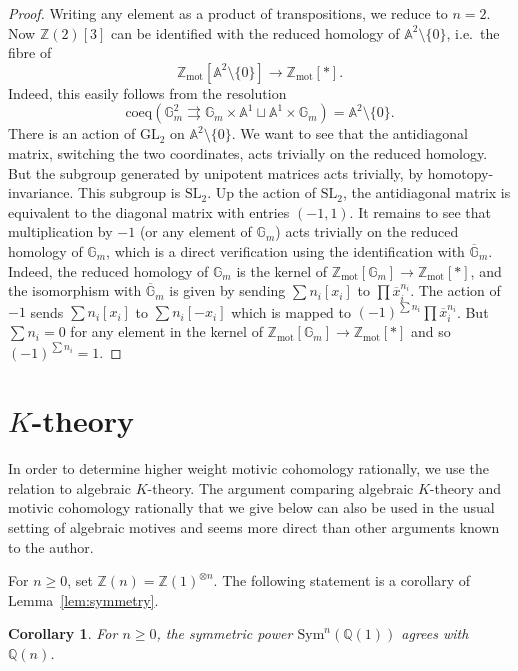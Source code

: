 \documentclass[11pt]{amsart}
\numberwithin{equation}{section}
\numberwithin{theorem}{section}
\newtheorem{corollary}[theorem]{Corollary}
\theoremstyle{definition}
\begin{document}
\begin{proof} Writing any element as a product of transpositions, we reduce to $n=2$. Now $\mathbb Z(2)[3]$ can be identified with the reduced homology of $\mathbb A^2\setminus \{0\}$, i.e.~the fibre of
\[
\mathbb Z_{\mathrm{mot}}[\mathbb A^2\setminus \{0\}]\to \mathbb Z_{\mathrm{mot}}[\ast].
\]
Indeed, this easily follows from the resolution
\[
\mathrm{coeq}(\mathbb G_m^2\rightrightarrows \mathbb G_m\times \mathbb A^1\sqcup \mathbb A^1\times \mathbb G_m)= \mathbb A^2\setminus \{0\}.
\]
There is an action of $\mathrm{GL}_2$ on $\mathbb A^2\setminus \{0\}$. We want to see that the antidiagonal matrix, switching the two coordinates, acts trivially on the reduced homology. But the subgroup generated by unipotent matrices acts trivially, by homotopy-invariance. This subgroup is $\mathrm{SL}_2$. Up the action of $\mathrm{SL}_2$, the antidiagonal matrix is equivalent to the diagonal matrix with entries $(-1,1)$. It remains to see that multiplication by $-1$ (or any element of $\mathbb G_m$) acts trivially on the reduced homology of $\mathbb G_m$, which is a direct verification using the identification with $\overline{\mathbb G}_m$. Indeed, the reduced homology of $\mathbb G_m$ is the kernel of $\mathbb Z_{\mathrm{mot}}[\mathbb G_m]\to \mathbb Z_{\mathrm{mot}}[\ast]$, and the isomorphism with $\overline{\mathbb G}_m$ is given by sending $\sum n_i [x_i]$ to $\prod \overline{x}_i^{n_i}$. The action of $-1$ sends $\sum n_i [x_i]$ to $\sum n_i [-x_i]$ which is mapped to $(-1)^{\sum n_i} \prod \overline{x}_i^{n_i}$. But $\sum n_i=0$ for any element in the kernel of $\mathbb Z_{\mathrm{mot}}[\mathbb G_m]\to \mathbb Z_{\mathrm{mot}}[\ast]$ and so $(-1)^{\sum n_i} = 1$.
\end{proof}

\section{$K$-theory}

In order to determine higher weight motivic cohomology rationally, we use the relation to algebraic $K$-theory. The argument comparing algebraic $K$-theory and motivic cohomology rationally that we give below can also be used in the usual setting of algebraic motives and seems more direct than other arguments known to the author.

For $n\geq 0$, set $\mathbb Z(n) = \mathbb Z(1)^{\otimes n}$. The following statement is a corollary of Lemma~\ref{lem:symmetry}.

\begin{corollary} For $n\geq 0$, the symmetric power $\mathrm{Sym}^n(\mathbb Q(1))$ agrees with $\mathbb Q(n)$.
\end{corollary}
\end{document}
